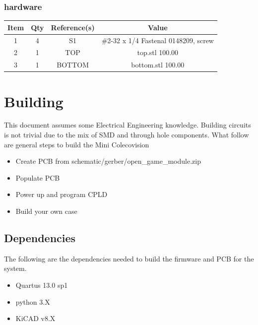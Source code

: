 \subsubsection{hardware}
\begin{footnotesize}
\begin{longtable}{ |*{4}{c|} }
\hline
{Item} & {Qty} & {Reference(s)} & {Value} \\
\hline
{1} & {4} & {S1} & {\#2-32 x 1/4 Fastenal 0148209, screw} \\
\hline
{2} & {1} & {TOP} & {top.stl 100.00} \\
\hline
{3} & {1} & {BOTTOM} & {bottom.stl 100.00} \\
\hline
\end{longtable}
\end{footnotesize}

\section{Building}

\par
This document assumes some Electrical Engineering knowledge. Building circuits is not
trivial due to the mix of SMD and through hole components. What follow are general
steps to build the Mini Colecovision

\begin{itemize}
  \item Create PCB from schematic/gerber/open\_game\_module.zip
  \item Populate PCB
  \item Power up and program CPLD
  \item Build your own case
\end{itemize}

\subsection{Dependencies}

\par
The following are the dependencies needed to build the firmware and PCB for the system.

\begin{itemize}
  \item Quartus 13.0 sp1
  \item python 3.X
  \item KiCAD v8.X
\end{itemize}



